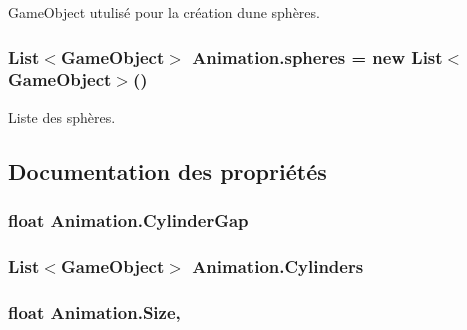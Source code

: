 Game\+Object utulisé pour la création d\textquotesingle{}une sphères. 

\hypertarget{class_animation_a96d77d0a4644c0a153f23c2f82ce50b9}{}
\subsubsection[{spheres}]{\setlength{\rightskip}{0pt plus 5cm}List$<$Game\+Object$>$ Animation.\+spheres = new List$<$Game\+Object$>$()}\label{class_animation_a96d77d0a4644c0a153f23c2f82ce50b9}


Liste des sphères. 



\subsection{Documentation des propriétés}
\hypertarget{class_animation_a8d437d68fafe3193dc3b3bb652cfb4a8}{}
\subsubsection[{Cylinder\+Gap}]{\setlength{\rightskip}{0pt plus 5cm}float Animation.\+Cylinder\+Gap\hspace{0.3cm}{\ttfamily [get]}}\label{class_animation_a8d437d68fafe3193dc3b3bb652cfb4a8}
\hypertarget{class_animation_ada29c182dd9f01da8c5ee8f5afbf78cc}{}
\subsubsection[{Cylinders}]{\setlength{\rightskip}{0pt plus 5cm}List$<$Game\+Object$>$ Animation.\+Cylinders\hspace{0.3cm}{\ttfamily [get]}}\label{class_animation_ada29c182dd9f01da8c5ee8f5afbf78cc}
\hypertarget{class_animation_a2f2503f2087a873db779061cbf5ac188}{}
\subsubsection[{Size}]{\setlength{\rightskip}{0pt plus 5cm}float Animation.\+Size\hspace{0.3cm}{\ttfamily [get]}, {\ttfamily [set]}}\label{class_animation_a2f2503f2087a873db779061cbf5ac188}
\hypertarget{class_animation_a54aef17d1bdc63728b435debc61a516f}{}
